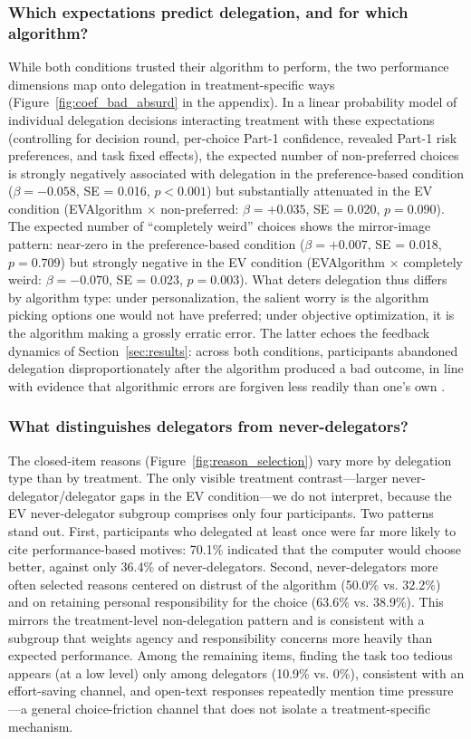 \documentclass[a4paper, 12pt, fleqn]{article}
\theoremstyle{definition}
\begin{document}
\subsubsection*{Which expectations predict delegation, and for which algorithm?}
While both conditions trusted their algorithm to perform, the two performance dimensions map onto delegation in treatment-specific ways (Figure~\ref{fig:coef_bad_absurd} in the appendix). In a linear probability model of individual delegation decisions interacting treatment with these expectations (controlling for decision round, per-choice Part-1 confidence, revealed Part-1 risk preferences, and task fixed effects), the expected number of non-preferred choices is strongly negatively associated with delegation in the preference-based condition ($\beta = -0.058$, SE = 0.016, $p < 0.001$) but substantially attenuated in the EV condition (EVAlgorithm $\times$ non-preferred: $\beta = +0.035$, SE = 0.020, $p = 0.090$). The expected number of ``completely weird'' choices shows the mirror-image pattern: near-zero in the preference-based condition ($\beta = +0.007$, SE = 0.018, $p = 0.709$) but strongly negative in the EV condition (EVAlgorithm $\times$ completely weird: $\beta = -0.070$, SE = 0.023, $p = 0.003$). What deters delegation thus differs by algorithm type: under personalization, the salient worry is the algorithm picking options one would not have preferred; under objective optimization, it is the algorithm making a grossly erratic error. The latter echoes the feedback dynamics of Section~\ref{sec:results}: across both conditions, participants abandoned delegation disproportionately after the algorithm produced a bad outcome, in line with evidence that algorithmic errors are forgiven less readily than one's own \citep{Dietvorst2018,Renier2021}.

\subsubsection*{What distinguishes delegators from never-delegators?}
The closed-item reasons (Figure~\ref{fig:reason_selection}) vary more by delegation type than by treatment. The only visible treatment contrast---larger never-delegator/delegator gaps in the EV condition---we do not interpret, because the EV never-delegator subgroup comprises only four participants. Two patterns stand out. First, participants who delegated at least once were far more likely to cite performance-based motives: 70.1\% indicated that the computer would choose better, against only 36.4\% of never-delegators. Second, never-delegators more often selected reasons centered on distrust of the algorithm (50.0\% vs. 32.2\%) and on retaining personal responsibility for the choice (63.6\% vs. 38.9\%). This mirrors the treatment-level non-delegation pattern and is consistent with a subgroup that weights agency and responsibility concerns more heavily than expected performance. Among the remaining items, finding the task too tedious appears (at a low level) only among delegators (10.9\% vs. 0\%), consistent with an effort-saving channel, and open-text responses repeatedly mention time pressure---a general choice-friction channel that does not isolate a treatment-specific mechanism.
\end{document}
